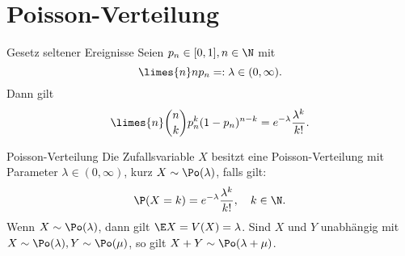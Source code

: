 \section*{Poisson-Verteilung}

\begin{karte}{Gesetz seltener Ereignisse}
    Seien \( p_n \in [0,1], n\in\N \) mit 
    \[ \limes{n} n p_n =: \lambda \in (0,\infty). \]
    Dann gilt 
    \[ \limes{n} \binom{n}{k} p_n^k (1 - p_n)^{n-k} 
    = e^{-\lambda} \frac{\lambda^k}{k!}. \]
\end{karte}

\begin{karte}{Poisson-Verteilung}
    Die Zufallsvariable \( X \) besitzt eine Poisson-Verteilung mit Parameter 
    \( \lambda \in (0,\infty) \), kurz \( X \sim \Po(\lambda) \), falls gilt: 
    \[ \P(X = k) = e^{-\lambda} \frac{\lambda^k}{k!}, \quad k\in \N. \]
    Wenn \( X \sim \Po(\lambda) \), dann gilt 
    \( \E X = V(X) = \lambda \). Sind \( X \) und \( Y \) unabhängig mit 
    \( X \sim \Po(\lambda), Y \sim \Po(\mu) \), so gilt 
    \( X + Y \sim \Po(\lambda + \mu) \).
\end{karte}